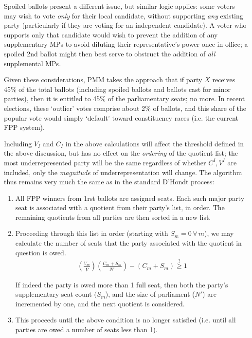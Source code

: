 \documentclass[DIV=calc, paper=a4, fontsize=11pt, twocolumn]{scrartcl}	 %
\begin{document}
Spoiled ballots present a different issue, but similar logic applies: some voters may wish to vote \emph{only} for their local candidate, without supporting \emph{any} existing party (particularly if they are voting for an independent candidate). A voter who supports only that candidate would wish to prevent the addition of any supplementary MPs to avoid diluting their representative's power once in office; a spoiled 2nd ballot might then best serve to obstruct the addition of \emph{all} supplemental MPs.

Given these considerations, PMM takes the approach that if party $X$ receives 45\% of the total ballots (including spoiled ballots and ballots cast for minor parties), then it is entitled to 45\% of the parliamentary seats; no more. In recent elections, these `outlier' votes comprise about 2\% of ballots, and this share of the popular vote would simply `default' toward  constituency races (i.e. the current FPP system). 

Including $V_I$ and $C_I$ in the above calculations will affect the threshold defined in the above discussion, but has no effect on the \emph{ordering} of the quotient list; the most underrepresented party will be the same regardless of whether $C^I, V^I$ are included, only the \emph{magnitude} of underrepresentation will change. 
The algorithm thus remains very much the same as in the standard D'Hondt process:

\begin{enumerate}
\item All FPP winners from 1rst ballots are assigned seats. Each such major party seat is associated with a quotient from their party's list, in order. The remaining quotients from all parties are then sorted in a new list.

\item Proceeding through this list in order (starting with $S_m=0 \, \forall \, m$), we may calculate the number of seats that the party associated with the quotient in question is owed. 
\begin{align}
\left(\frac{V_m}{\bar V} \right) \left(\frac{C_m+S_m}{N'}\right) -(C_m+S_m) \stackrel{?}{\ge} 1
\end{align} 

If indeed the party is owed more than 1 full seat, then both the party's supplementary seat count ($S_m$), and the size of parliament ($N'$) are incremented by one, and the next quotient is considered. 

\item This proceeds until the above condition is no longer satisfied (i.e. until all parties are owed a number of seats less than 1). 
\end{enumerate}
\end{document}
